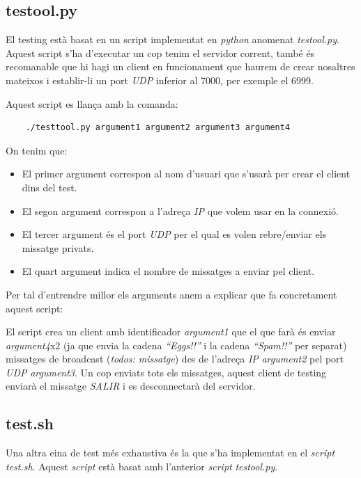 \documentclass[a4paper,10pt]{article}
\begin{document}
	\subsection{testool.py}	
	El testing està basat en un script implementat en \emph{python} anomenat \emph{testool.py}. Aquest script s'ha d'executar un cop tenim el servidor corrent, també és recomanable que hi hagi un client en funcionament que haurem de crear nosaltres mateixos i establir-li un port \emph{UDP} inferior al 7000, per exemple el 6999.
	
	Aquest script es llança amb la comanda:
	\begin{verbatim}
	./testtool.py argument1 argument2 argument3 argument4
	\end{verbatim}
	On tenim que:
		\begin{itemize}
		\item El primer argument correspon al nom d'usuari que s'usarà per crear el client dins del test.
		\item El segon argument correspon a l'adreça \emph{IP} que volem usar en la connexió.
		\item El tercer argument és el port \emph{UDP} per el qual es volen rebre/enviar els missatge privats.
		\item El quart argument indica el nombre de missatges a enviar pel client.
		\end{itemize}
	Per tal d'entrendre millor els arguments anem a explicar que fa concretament aquest script:
	
	El script crea un client amb identificador \emph{argument1} que el que farà és enviar \emph{argument4}x2 (ja que envia la cadena \emph{``Eggs!!''} i la cadena \emph{``Spam!!''} per separat) missatges de broadcast (\emph{todos: missatge}) des de l'adreça \emph{IP} \emph{argument2} pel port \emph{UDP} \emph{argument3}. Un cop enviats tots els missatges, aquest client de testing enviarà el missatge \emph{SALIR} i es desconnectarà del servidor.

	\subsection{test.sh}
	Una altra eina de test més exhaustiva és la que s'ha implementat en el \emph{script} \emph{test.sh}. Aquest \emph{script} està basat amb l'anterior \emph{script} \emph{testool.py}.
\end{document}
